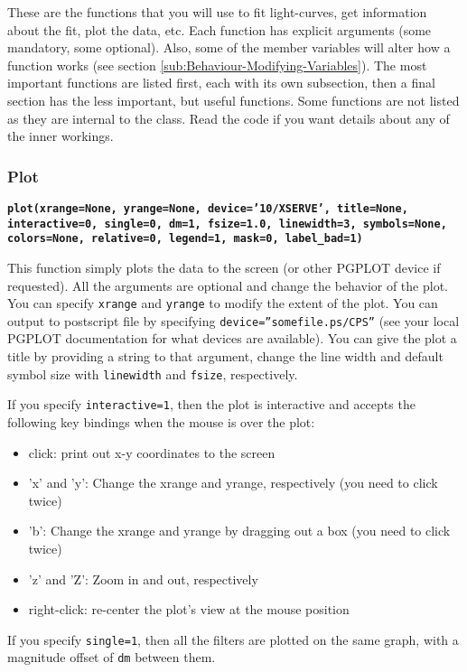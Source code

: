 \documentclass[12pt]{article}
\begin{document}
These are the functions that you will use to fit light-curves, get
information about the fit, plot the data, etc. Each function has explicit
arguments (some mandatory, some optional). Also, some of the member
variables will alter how a function works (see section \ref{sub:Behaviour-Modifying-Variables}).
The most important functions are listed first, each with its own subsection,
then a final section has the less important, but useful functions.
Some functions are not listed as they are internal to the class. Read
the code if you want details about any of the inner workings.


\subsubsection{Plot}

\texttt{\textbf{plot(xrange=None, yrange=None, device='10/XSERVE',
title=None, interactive=0, single=0, dm=1, fsize=1.0, linewidth=3,
symbols=None, colors=None, relative=0, legend=1, mask=0, label\_bad=1)}}

This function simply plots the data to the screen (or other PGPLOT
device if requested). All the arguments are optional and change the
behavior of the plot. You can specify \texttt{xrange} and \texttt{yrange}
to modify the extent of the plot. You can output to postscript file
by specifying \texttt{device=''somefile.ps/CPS''} (see your local
PGPLOT documentation for what devices are available). You can give
the plot a title by providing a string to that argument, change the
line width and default symbol size with \texttt{linewidth} and \texttt{fsize},
respectively. 

If you specify \texttt{interactive=1}, then the plot is interactive
and accepts the following key bindings when the mouse is over the
plot:

\begin{itemize}
\item click: print out x-y coordinates to the screen
\item 'x' and 'y': Change the xrange and yrange, respectively (you need
to click twice)
\item 'b': Change the xrange and yrange by dragging out a box (you need
to click twice)
\item 'z' and 'Z': Zoom in and out, respectively
\item right-click: re-center the plot's view at the mouse position
\end{itemize}
If you specify \texttt{single=1}, then all the filters are plotted
on the same graph, with a magnitude offset of \texttt{dm} between
them.
\end{document}

